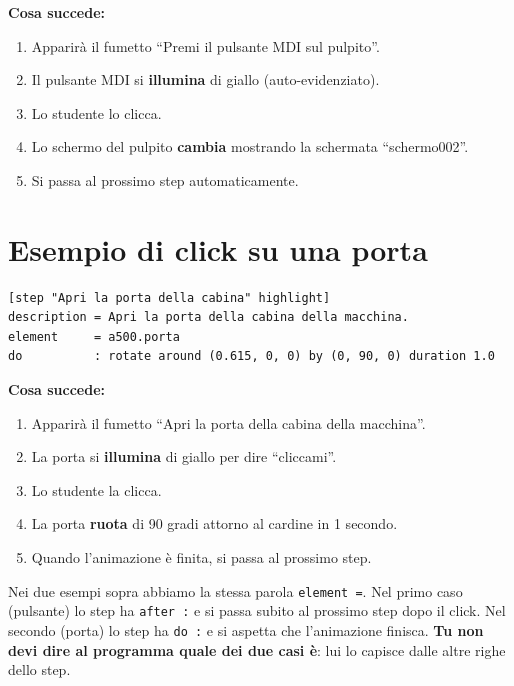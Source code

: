 ﻿\documentclass[a4paper,12pt,oneside]{book}
\newcommand{\kw}[1]{\texttt{\color{keycolor}#1}}
\begin{document}
\textbf{Cosa succede:}

\begin{enumerate}
  \item Apparirà il fumetto ``Premi il pulsante MDI sul pulpito''.
  \item Il pulsante MDI si \textbf{illumina} di giallo (auto-evidenziato).
  \item Lo studente lo clicca.
  \item Lo schermo del pulpito \textbf{cambia} mostrando la schermata
        ``schermo002''.
  \item Si passa al prossimo step automaticamente.
\end{enumerate}

\section{Esempio di click su una porta}

\begin{esempiocvt}
\begin{lstlisting}
[step "Apri la porta della cabina" highlight]
description = Apri la porta della cabina della macchina.
element     = a500.porta
do          : rotate around (0.615, 0, 0) by (0, 90, 0) duration 1.0
\end{lstlisting}
\end{esempiocvt}

\textbf{Cosa succede:}

\begin{enumerate}
  \item Apparirà il fumetto ``Apri la porta della cabina della macchina''.
  \item La porta si \textbf{illumina} di giallo per dire ``cliccami''.
  \item Lo studente la clicca.
  \item La porta \textbf{ruota} di 90 gradi attorno al cardine in 1 secondo.
  \item Quando l'animazione è finita, si passa al prossimo step.
\end{enumerate}

\begin{notablu}
Nei due esempi sopra abbiamo la stessa parola \kw{element =}. Nel primo
caso (pulsante) lo step ha \kw{after :} e si passa subito al prossimo step
dopo il click. Nel secondo (porta) lo step ha \kw{do :} e si aspetta che
l'animazione finisca. \textbf{Tu non devi dire al programma quale dei due
casi è}: lui lo capisce dalle altre righe dello step.
\end{notablu}
\end{document}
